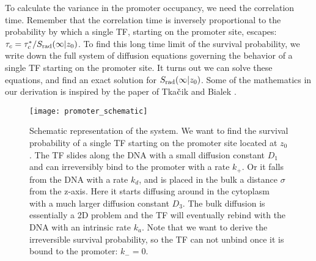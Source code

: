 To calculate the variance in the promoter occupancy, we need the correlation time. Remember that the correlation time is inversely proportional to the probability by which a single TF, starting on the promoter site, escapes: $\tau_c = \tau_c^* / S_{\rm rad}(\infty|z_0)$. To find this long time limit of the survival probability, we write down the full system of diffusion equations governing the behavior of a single TF starting on the promoter site. It turns out we can solve these equations, and find an exact solution for $S_{\rm rad}(\infty|z_0)$. Some of the mathematics in our derivation is inspired by the paper of Tka$\check{\rm c}$ik and Bialek \cite{Tkacik2009}. 

\begin{figure}[ht]
\centering
\texttt{[image: promoter\_schematic]}
\caption{ Schematic representation of the system. We want to find the survival probability of a single TF starting on the promoter site located at $z_0$. The TF slides along the DNA with a small diffusion constant $D_1$ and can irreversibly bind to the promoter with a rate $k_+$. Or it falls from the DNA with a rate $k_d$, and is placed in the bulk a distance $\sigma$ from the z-axis. Here it starts diffusing around in the cytoplasm with a much larger diffusion constant $D_3$. The bulk diffusion is essentially a 2D problem and the TF will eventually rebind with the DNA with an intrinsic rate $k_a$. Note that we want to derive the irreversible survival probability, so the TF can not unbind once it is bound to the promoter: $k_- = 0$.}
\end{figure}

